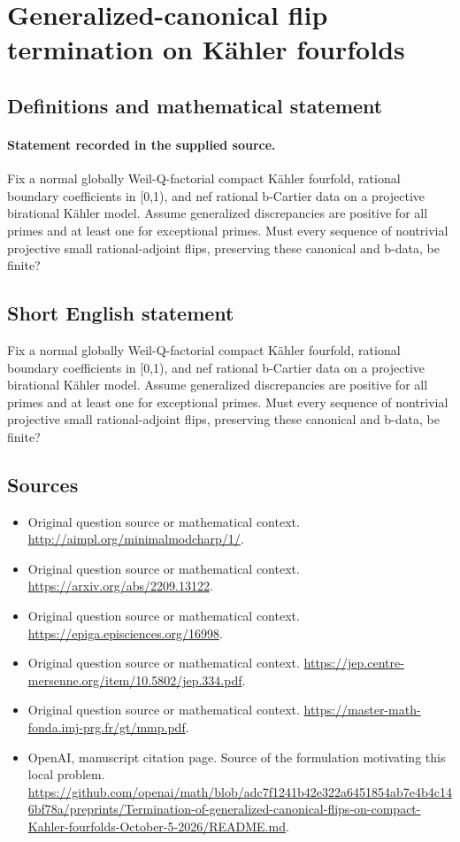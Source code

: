 \documentclass[11pt]{article}
\begin{document}
\section*{Generalized-canonical flip termination on Kähler fourfolds}\label{30007026}
\subsection{Definitions and mathematical statement}
\paragraph{Statement recorded in the supplied source.}
Fix a normal globally Weil-Q-factorial compact Kähler fourfold, rational boundary coefficients in [0,1), and nef rational b-Cartier data on a projective birational Kähler model. Assume generalized discrepancies are positive for all primes and at least one for exceptional primes. Must every sequence of nontrivial projective small rational-adjoint flips, preserving these canonical and b-data, be finite?
\subsection{Short English statement}
Fix a normal globally Weil-Q-factorial compact Kähler fourfold, rational boundary coefficients in [0,1), and nef rational b-Cartier data on a projective birational Kähler model. Assume generalized discrepancies are positive for all primes and at least one for exceptional primes. Must every sequence of nontrivial projective small rational-adjoint flips, preserving these canonical and b-data, be finite?
\subsection{Sources}
\begin{itemize}
\item[S1] Original question source or mathematical context.
\url{http://aimpl.org/minimalmodcharp/1/}.
\item[S2] Original question source or mathematical context.
\url{https://arxiv.org/abs/2209.13122}.
\item[S3] Original question source or mathematical context.
\url{https://epiga.episciences.org/16998}.
\item[S4] Original question source or mathematical context.
\url{https://jep.centre-mersenne.org/item/10.5802/jep.334.pdf}.
\item[S5] Original question source or mathematical context.
\url{https://master-math-fonda.imj-prg.fr/gt/mmp.pdf}.
\item[S6] OpenAI, manuscript citation page. Source of the formulation motivating this local problem.
\url{https://github.com/openai/math/blob/adc7f1241b42e322a6451854ab7e4b4c146bf78a/preprints/Termination-of-generalized-canonical-flips-on-compact-Kahler-fourfolds-October-5-2026/README.md}.
\end{itemize}
\end{document}
